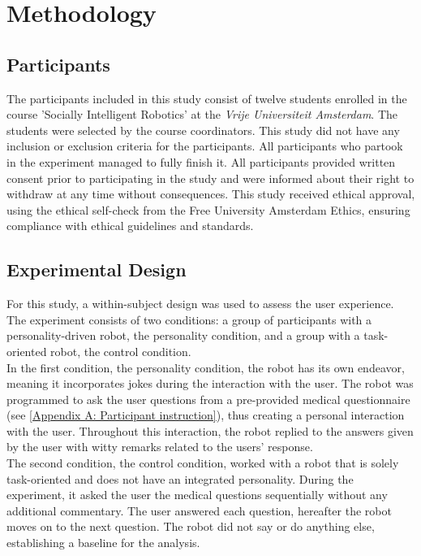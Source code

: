 \documentclass[runningheads]{llncs}
\begin{document}
\section{Methodology}

\subsection{Participants}
The participants included in this study consist of twelve students enrolled in the course 'Socially Intelligent Robotics' at the \textit{Vrije Universiteit Amsterdam}. The students were selected by the course coordinators. This study did not have any inclusion or exclusion criteria for the participants. All participants who partook in the experiment managed to fully finish it. All participants provided written consent prior to participating in the study and were informed about their right to withdraw at any time without consequences. This study received ethical approval, using the ethical self-check from the Free University Amsterdam Ethics, ensuring compliance with ethical guidelines and standards. 

\subsection{Experimental Design}
For this study, a within-subject design was used to assess the user experience. The experiment consists of two conditions: a group of participants with a personality-driven robot, the personality condition, and a group with a task-oriented robot, the control condition. \\

In the first condition, the personality condition, the robot has its own endeavor, meaning it incorporates jokes during the interaction with the user. The robot was programmed to ask the user questions from a pre-provided medical questionnaire (see \ref{Appendix A: Participant instruction}), thus creating a personal interaction with the user. Throughout this interaction, the robot replied to the answers given by the user with witty remarks related to the users' response.\\

The second condition, the control condition, worked with a robot that is solely task-oriented and does not have an integrated personality. During the experiment, it asked the user the medical questions sequentially without any additional commentary. The user answered each question, hereafter the robot moves on to the next question. The robot did not say or do anything else, establishing a baseline for the analysis. \\
\end{document}
